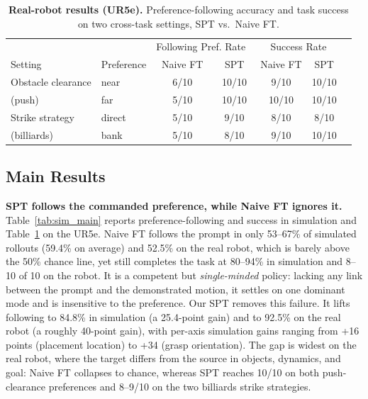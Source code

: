 \documentclass{article}
\begin{document}
\begin{table}[t]
  \centering
  \small
  \caption{\textbf{Real-robot results (UR5e).} Preference-following accuracy and
  task success on two cross-task settings, SPT vs.\ Naive FT. }
  \label{tab:real_main}
  \begin{tabular}{llccccc}
    \hline
    & & \multicolumn{2}{c}{Following Pref. Rate\ } & \multicolumn{2}{c}{Success Rate} \\
    Setting & Preference & Naive FT & SPT & Naive FT & SPT \\
    \hline
    Obstacle clearance & near    & 6/10 & 10/10 & 9/10 & 10/10 \\
    (push)             & far     & 5/10 & 10/10 & 10/10 & 10/10 \\
    Strike strategy    & direct  & 5/10 & 9/10 & 8/10 & 8/10 \\
    (billiards)        & bank    & 5/10 & 8/10 & 9/10 & 10/10 \\
    \hline
  \end{tabular}
\end{table}

\subsection{Main Results}
\label{sec:exp-main}


\textbf{SPT follows the commanded preference, while Naive FT ignores it.}
Table~\ref{tab:sim_main} reports preference-following and success in simulation
and Table~\ref{tab:real_main} on the UR5e. Naive FT follows the prompt in only
53--67\% of simulated rollouts (59.4\% on average) and 52.5\% on the real
robot, which is barely above the 50\% chance line, yet still completes the task at
80--94\% in simulation and 8--10 of 10 on the robot. It is a competent but
\emph{single-minded} policy: lacking any link between the prompt and the
demonstrated motion, it settles on one dominant mode and is insensitive to the
preference. Our SPT removes this failure. It lifts following to 84.8\% in
simulation (a 25.4-point gain) and to 92.5\% on the real robot (a roughly
40-point gain), with per-axis simulation gains ranging from +16 points (placement
location) to +34 (grasp orientation). The gap is widest on the real robot, where
the target differs from the source in objects, dynamics, and goal: Naive FT
collapses to chance, whereas SPT reaches 10/10 on both push-clearance preferences
and 8--9/10 on the two billiards strike strategies.
\end{document}
